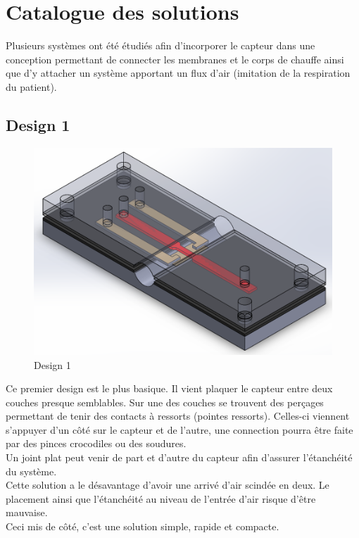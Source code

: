 \section{Catalogue des solutions}
Plusieurs systèmes ont été étudiés afin d'incorporer le capteur dans une conception permettant de connecter les membranes et le corps de chauffe
ainsi que d'y attacher un système apportant un flux d'air (imitation de la respiration du patient).

\subsection{Design 1}
\begin{figure}[H]
    \centering
    \includegraphics[scale = 0.3]{images/Design1.png}
    \caption{Design 1}
    \label{fig:design1}
\end{figure}
Ce premier design est le plus basique. Il vient plaquer le capteur entre deux couches presque semblables. Sur une des couches se trouvent des
perçages permettant de tenir des contacts à ressorts (pointes ressorts). Celles-ci viennent s'appuyer d'un côté sur le capteur et
de l'autre, une  connection pourra être faite par des pinces crocodiles ou des soudures. \\
Un joint plat peut venir de part et d'autre du capteur afin d'assurer l'étanchéité du système.\\
Cette solution a le désavantage d'avoir une arrivé d'air scindée en deux. Le placement ainsi que l'étanchéité au niveau de l'entrée
d'air risque d'être mauvaise. \\
Ceci mis de côté, c'est une solution simple, rapide et compacte.

